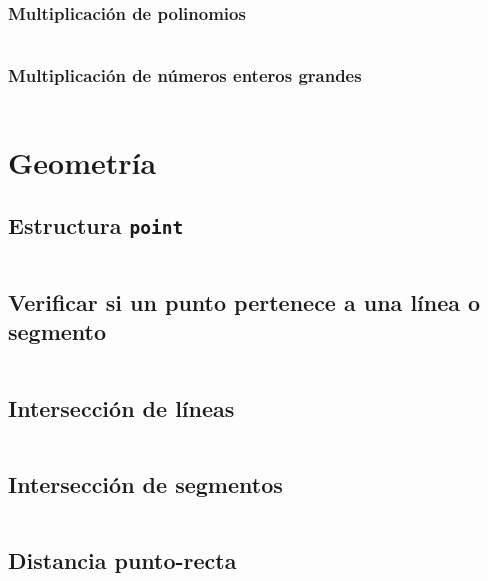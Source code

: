 \documentclass[11pt]{article}
\begin{document}
			\subsubsection{Multiplicación de polinomios}
			\inputminted[tabsize=2,breaklines,firstline=107,lastline=133,fontsize=\small]{c++}{fft.cpp}
			
			\subsubsection{Multiplicación de números enteros grandes}
			\inputminted[tabsize=2,breaklines,firstline=135,lastline=171,fontsize=\small]{c++}{fft.cpp}
			
	\newpage
	\section{Geometría}
		\subsection{Estructura \texttt{point}}
		\inputminted[tabsize=2,breaklines,firstline=4,lastline=100,fontsize=\small]{c++}{geometry.cpp}

		\subsection{Verificar si un punto pertenece a una línea o segmento}
		\inputminted[tabsize=2,breaklines,firstline=102,lastline=111,fontsize=\small]{c++}{geometry.cpp}
		
		\subsection{Intersección de líneas}
		\inputminted[tabsize=2,breaklines,firstline=113,lastline=133,fontsize=\small]{c++}{geometry.cpp}
		
		\subsection{Intersección de segmentos}
		\inputminted[tabsize=2,breaklines,firstline=150,lastline=167,fontsize=\small]{c++}{geometry.cpp}
		
		\subsection{Distancia punto-recta}
		\inputminted[tabsize=2,breaklines,firstline=169,lastline=172,fontsize=\small]{c++}{geometry.cpp}
		
\end{document}
